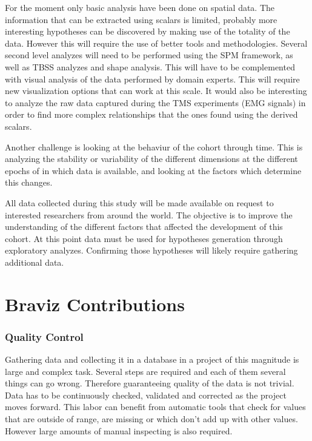 For the moment only basic analysis have been done on spatial data. The information that can be extracted using scalars is limited, probably more interesting hypotheses can be discovered by making use of the totality of the data. However this will require the use of better tools and methodologies. Several second level analyzes will need to be performed using the SPM framework, as well as TBSS analyzes and shape analysis. This will have to be complemented with visual analysis of the data performed by domain experts. This will require new visualization options that can work at this scale. It would also be interesting to analyze the raw data captured during the TMS experiments (EMG signals) in order to find more complex relationships that the ones found using the derived scalars. 

Another challenge is looking at the behaviur of the cohort through time. This is analyzing the stability or variability of the different dimensions at the different epochs of in which data is available, and looking at the factors which determine this changes.

All data collected during this study will be made available on request to interested researchers from around the world. The objective is to improve the understanding of the different factors that affected the development of this cohort. At this point data must be used for hypotheses generation through exploratory analyzes. Confirming those hypotheses will likely require gathering additional data.



\section{Braviz Contributions}

\subsubsection{Quality Control}

Gathering data and collecting it in a database in a project of this magnitude is large and complex task. Several steps are required and each of them several things can go wrong. Therefore guaranteeing quality of the data is not trivial. Data has to be continuously checked, validated and corrected as the project moves forward. This labor can benefit from automatic tools that check for values that are outside of range, are missing or which don't add up with other values. However large amounts of manual inspecting is also required. 

